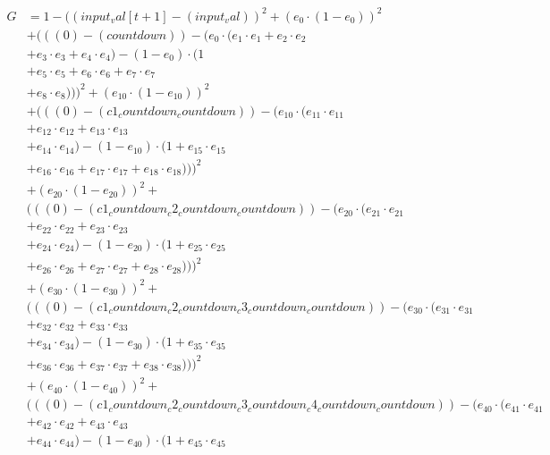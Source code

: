 \documentclass[10pt, a4paper]{article}
\begin{document}
\begin{small}
\begin{align*}
G &= 1 - ((input_val[t+1] - (input_val))^{2} + (e_{0} \cdot (1 - e_{0}))^{2} \\
& + (((0) - (countdown)) - (e_{0} \cdot (e_{1} \cdot e_{1} + e_{2} \cdot e_{2} \\
& + e_{3} \cdot e_{3} + e_{4} \cdot e_{4}) - (1 - e_{0}) \cdot (1 \\
& + e_{5} \cdot e_{5} + e_{6} \cdot e_{6} + e_{7} \cdot e_{7} \\
& + e_{8} \cdot e_{8})))^{2} + (e_{10} \cdot (1 - e_{10}))^{2} \\
& + (((0) - (c1_countdown_countdown)) - (e_{10} \cdot (e_{11} \cdot e_{11} \\
& + e_{12} \cdot e_{12} + e_{13} \cdot e_{13} \\
& + e_{14} \cdot e_{14}) - (1 - e_{10}) \cdot (1 + e_{15} \cdot e_{15} \\
& + e_{16} \cdot e_{16} + e_{17} \cdot e_{17} + e_{18} \cdot e_{18})))^{2} \\
& + (e_{20} \cdot (1 - e_{20}))^{2} + \\
& (((0) - (c1_countdown_c2_countdown_countdown)) - (e_{20} \cdot (e_{21} \cdot e_{21} \\
& + e_{22} \cdot e_{22} + e_{23} \cdot e_{23} \\
& + e_{24} \cdot e_{24}) - (1 - e_{20}) \cdot (1 + e_{25} \cdot e_{25} \\
& + e_{26} \cdot e_{26} + e_{27} \cdot e_{27} + e_{28} \cdot e_{28})))^{2} \\
& + (e_{30} \cdot (1 - e_{30}))^{2} + \\
& (((0) - (c1_countdown_c2_countdown_c3_countdown_countdown)) - (e_{30} \cdot (e_{31} \cdot e_{31} \\
& + e_{32} \cdot e_{32} + e_{33} \cdot e_{33} \\
& + e_{34} \cdot e_{34}) - (1 - e_{30}) \cdot (1 + e_{35} \cdot e_{35} \\
& + e_{36} \cdot e_{36} + e_{37} \cdot e_{37} + e_{38} \cdot e_{38})))^{2} \\
& + (e_{40} \cdot (1 - e_{40}))^{2} + \\
& (((0) - (c1_countdown_c2_countdown_c3_countdown_c4_countdown_countdown)) - (e_{40} \cdot (e_{41} \cdot e_{41} \\
& + e_{42} \cdot e_{42} + e_{43} \cdot e_{43} \\
& + e_{44} \cdot e_{44}) - (1 - e_{40}) \cdot (1 + e_{45} \cdot e_{45} \\

\end{align*}
\end{small}
\end{document}
